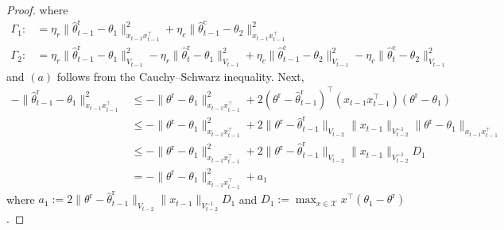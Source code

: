 \documentclass[accepted]{uai2025} %
\theoremstyle{plain}
\theoremstyle{definition}
\theoremstyle{remark}
\newcommand{\truethetar}{\theta^{\mathrm{r}}}
\begin{document}
\begin{proof}
where 
\begin{align*}
    \Gamma_1:&=\eta_r \| \hat{\theta}^\mathrm{r}_{t-1} - \theta_1 \|^2_{x_{t-1} x_{t-1}^\top}+ \eta_c \| \hat{\theta}^\mathrm{c}_{t-1} - \theta_2 \|^2_{x_{t-1} x_{t-1}^\top}
   \\ \Gamma_2:&=\eta_r \| \hat{\theta}^\mathrm{r}_{t-1} - \theta_1 \|_{V_{t-1}}^2 - \eta_r \| \hat{\theta}^\mathrm{r}_{t} - \theta_1 \|_{V_{t-1}}^2+\eta_c \| \hat{\theta}^\mathrm{c}_{t-1} - \theta_2 \|_{V_{t-1}}^2 - \eta_c \| \hat{\theta}^\mathrm{c}_{t} - \theta_2 \|_{V_{t-1}}^2
\end{align*}
and $(a)$  follows from the Cauchy--Schwarz inequality. Next,
\begin{align*}
    -{\| \hat{\theta}_{t-1}^\mathrm{r} - \theta_1 \|^2_{x_{t-1} x_{t-1}^\top}} &\leq - \| \truethetar - \theta_1 \|^2_{x_{t-1} x_{t-1}^\top} + 2 (\truethetar - \hat{\theta}_{t-1}^\mathrm{r})^\top (x_{t-1} x_{t-1}^\top) (\truethetar - \theta_1) \\
    &\overset{}{\leq} - \| \truethetar - \theta_1 \|^2_{x_{t-1} x_{t-1}^\top} + 2 \| \truethetar - \hat{\theta}_{t-1}^\mathrm{r} \|_{V_{t-2}} \| x_{t-1} \|_{V_{t-2}^{-1}} \| \truethetar - \theta_1 \|_{x_{t-1} x_{t-1}^\top} \\
    &\overset{}{\leq} - \| \truethetar - \theta_1 \|^2_{x_{t-1} x_{t-1}^\top} + 2 \| \truethetar - \hat{\theta}_{t-1}^\mathrm{r} \|_{V_{t-2}} \| x_{t-1} \|_{V_{t-2}^{-1}} D_1 \\
    &= - \| \truethetar - \theta_1 \|^2_{x_{t-1} x_{t-1}^\top} + a_1
\end{align*}
where $a_1 := 2 \| \truethetar - \hat{\theta}_{t-1}^\mathrm{r} \|_{V_{t-2}} \| x_{t-1} \|_{V_{t-2}^{-1}} D_1$ and $D_1:=\max_{x\in\mathcal{X}} x^\top (\theta_1-\truethetar)$.


\end{proof}
\end{document}
